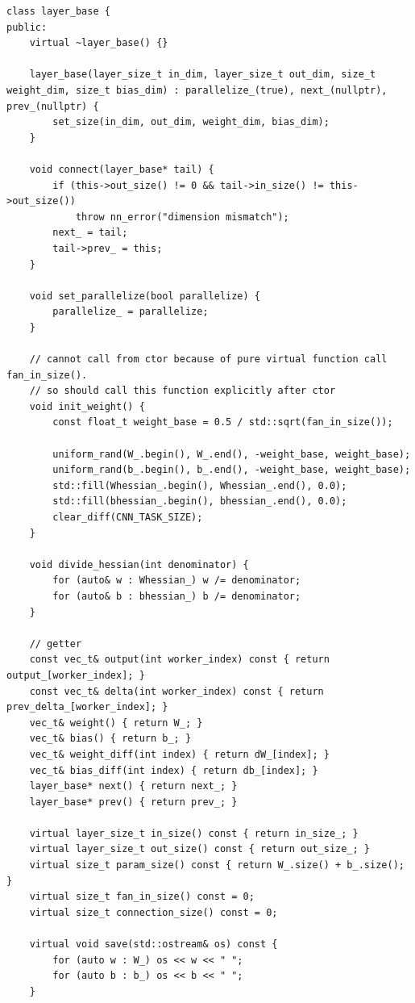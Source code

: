 \documentclass[utf8,usehyperref,14pt]{G7-32}
\begin{document}
\label{abslayer}
\begin{lstlisting}
class layer_base {
public:
    virtual ~layer_base() {}

    layer_base(layer_size_t in_dim, layer_size_t out_dim, size_t weight_dim, size_t bias_dim) : parallelize_(true), next_(nullptr), prev_(nullptr) {
        set_size(in_dim, out_dim, weight_dim, bias_dim);
    }

    void connect(layer_base* tail) {
        if (this->out_size() != 0 && tail->in_size() != this->out_size())
            throw nn_error("dimension mismatch");
        next_ = tail;
        tail->prev_ = this;
    }

    void set_parallelize(bool parallelize) {
        parallelize_ = parallelize;
    }

    // cannot call from ctor because of pure virtual function call fan_in_size().
    // so should call this function explicitly after ctor
    void init_weight() {
        const float_t weight_base = 0.5 / std::sqrt(fan_in_size());

        uniform_rand(W_.begin(), W_.end(), -weight_base, weight_base);
        uniform_rand(b_.begin(), b_.end(), -weight_base, weight_base);               
        std::fill(Whessian_.begin(), Whessian_.end(), 0.0);
        std::fill(bhessian_.begin(), bhessian_.end(), 0.0);
        clear_diff(CNN_TASK_SIZE);
    }

    void divide_hessian(int denominator) {
        for (auto& w : Whessian_) w /= denominator;
        for (auto& b : bhessian_) b /= denominator;
    }

    // getter
    const vec_t& output(int worker_index) const { return output_[worker_index]; }
    const vec_t& delta(int worker_index) const { return prev_delta_[worker_index]; }
    vec_t& weight() { return W_; }
    vec_t& bias() { return b_; }
    vec_t& weight_diff(int index) { return dW_[index]; }
    vec_t& bias_diff(int index) { return db_[index]; }
    layer_base* next() { return next_; }
    layer_base* prev() { return prev_; }

    virtual layer_size_t in_size() const { return in_size_; }
    virtual layer_size_t out_size() const { return out_size_; }
    virtual size_t param_size() const { return W_.size() + b_.size(); }
    virtual size_t fan_in_size() const = 0;
    virtual size_t connection_size() const = 0;

    virtual void save(std::ostream& os) const {
        for (auto w : W_) os << w << " ";
        for (auto b : b_) os << b << " ";
    }


\end{lstlisting}
\end{document}
